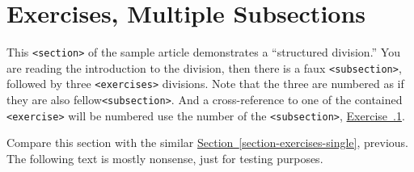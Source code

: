 \documentclass{amsart}
\theoremstyle{plain}%
\theoremstyle{definition}%
\theoremstyle{remark}%
\newcommand{\xreffont}{\relax}
\newcommand{\mono}[1]{\texttt{#1}}
\numberwithin{equation}{section}
\begin{document}
\section{Exercises, Multiple Subsections}\label{section-exercises-multiple}%
This \mono{<section>} of the sample article demonstrates a ``structured division.''  You are reading the introduction to the division, then there is a faux \mono{<subsection>}, followed by three \mono{<exercises>} divisions.  Note that the three are numbered as if they are also fellow\mono{<subsection>}.  And a cross-reference to one of the contained \mono{<exercise>} will be numbered use the number of the \mono{<subsection>}, \hyperlink{exercise-challenging-one-structured}{Exercise~{\xreffont 38.3.1}}.%
\par
Compare this section with the similar \hyperref[section-exercises-single]{Section~{\xreffont\ref{section-exercises-single}}}, previous.  The following text is mostly nonsense, just for testing purposes.%
%
%
\typeout{************************************************}
\typeout{************************************************}
%
\end{document}
